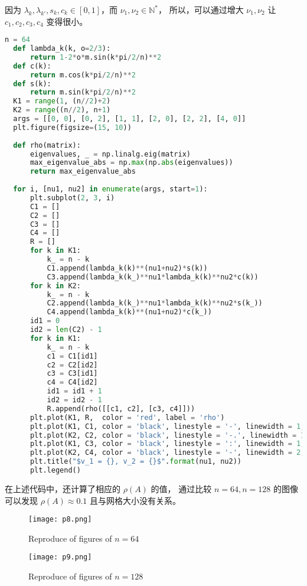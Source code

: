 \documentclass[lang=cn,a4paper,newtx,bibend=bibtex]{elegantpaper}
\begin{document}
\begin{solution}
因为 $\lambda_k, \lambda_{k'}, s_k, c_k \in [0, 1]$，而 $\nu_1, \nu_2 \in \mathbb{N}^*$，
所以，可以通过增大 $\nu_1, \nu_2$ 让 $c_1, c_2, c_3, c_4$ 变得很小。
\begin{lstlisting}[language=python]
  n = 64
  def lambda_k(k, o=2/3):
      return 1-2*o*m.sin(k*pi/2/n)**2
  def c(k):
      return m.cos(k*pi/2/n)**2
  def s(k):
      return m.sin(k*pi/2/n)**2
  K1 = range(1, (n//2)+2)
  K2 = range((n//2), n+1)
  args = [[0, 0], [0, 2], [1, 1], [2, 0], [2, 2], [4, 0]]
  plt.figure(figsize=(15, 10))
  
  def rho(matrix):
      eigenvalues, _ = np.linalg.eig(matrix)
      max_eigenvalue_abs = np.max(np.abs(eigenvalues))
      return max_eigenvalue_abs
  
  for i, [nu1, nu2] in enumerate(args, start=1):
      plt.subplot(2, 3, i)
      C1 = []
      C2 = []
      C3 = []
      C4 = []
      R = []
      for k in K1:
          k_ = n - k
          C1.append(lambda_k(k)**(nu1+nu2)*s(k))
          C3.append(lambda_k(k_)**nu1*lambda_k(k)**nu2*c(k))
      for k in K2:
          k_ = n - k
          C2.append(lambda_k(k_)**nu1*lambda_k(k)**nu2*s(k_))
          C4.append(lambda_k(k)**(nu1+nu2)*c(k_))
      id1 = 0
      id2 = len(C2) - 1
      for k in K1:
          k_ = n - k
          c1 = C1[id1]
          c2 = C2[id2]
          c3 = C3[id1]
          c4 = C4[id2]
          id1 = id1 + 1
          id2 = id2 - 1
          R.append(rho([[c1, c2], [c3, c4]]))
      plt.plot(K1, R,  color = 'red', label = 'rho')
      plt.plot(K1, C1, color = 'black', linestyle = '-', linewidth = 1, label = 'c1')
      plt.plot(K2, C2, color = 'black', linestyle = '-.', linewidth = 1, label = 'c2')
      plt.plot(K1, C3, color = 'black', linestyle = ':', linewidth = 1, label = 'c3')
      plt.plot(K2, C4, color = 'black', linestyle = '-', linewidth = 2, label = 'c4')
      plt.title("$v_1 = {}, v_2 = {}$".format(nu1, nu2))
      plt.legend()
\end{lstlisting}

在上述代码中，还计算了相应的 $\rho(A)$ 的值， 
通过比较 $n = 64, n= 128$ 的图像可以发现 $\rho(A) \approx 0.1$ 且与网格大小没有关系。

\begin{figure}[H]
  \centering
  \texttt{[image: p8.png]}
  \caption{Reproduce of figures of $n = 64$}
\end{figure}
\begin{figure}[H]
  \centering
  \texttt{[image: p9.png]}
  \caption{Reproduce of figures of $n = 128$}
\end{figure}
\end{solution}
\end{document}
